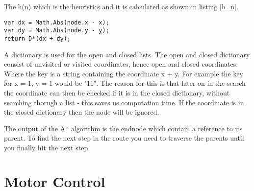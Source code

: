 The h(n) which is the heuristics and it is calculated as shown in listing \ref{h_n}. 

\begin{lstlisting}[caption={Calculation of h(n).}, label=h_n]
var dx = Math.Abs(node.x - x);
var dy = Math.Abs(node.y - y);
return D*(dx + dy);
\end{lstlisting}

A dictionary is used for the open and closed lists. The open and closed dictionary consist of unvisited or visited coordinates, hence open and closed coordinates. Where the key is a string containing the coordinate x + y. For example the key for x = 1, y = 1 would be "11". The reason for this is that later on in the search the coordinate can then be checked if it is in the closed dictionary, without searching thorugh a list - this saves us computation time. If the coordinate is in the closed dictionary then the node will be ignored.

The output of the A* algorithm is the endnode which contain a reference to its parent. To find the next step in the route you need to traverse the parents until you finally hit the next step.

\section{Motor Control}

